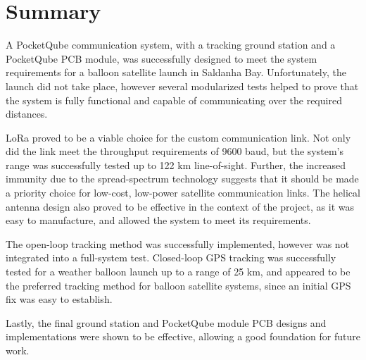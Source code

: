 \section{Summary}

A PocketQube communication system, with a tracking ground station and a PocketQube PCB module, was successfully designed to meet the system requirements for a balloon satellite launch in Saldanha Bay. Unfortunately, the launch did not take place, however several modularized tests helped to prove that the system is fully functional and capable of communicating over the required distances.

LoRa proved to be a viable choice for the custom communication link. Not only did the link meet the throughput requirements of 9600 baud, but the system's range was successfully tested up to 122 km line-of-sight. Further, the increased immunity due to the spread-spectrum technology suggests that it should be made a priority choice for low-cost, low-power satellite communication links. The helical antenna design also proved to be effective in the context of the project, as it was easy to manufacture, and allowed the system to meet its requirements.

The open-loop tracking method was successfully implemented, however was not integrated into a full-system test. Closed-loop GPS tracking was successfully tested for a weather balloon launch up to a range of 25 km, and appeared to be the preferred tracking method for balloon satellite systems, since an initial GPS fix was easy to establish.

Lastly, the final ground station and PocketQube module PCB designs and implementations were shown to be effective, allowing a good foundation for future work.